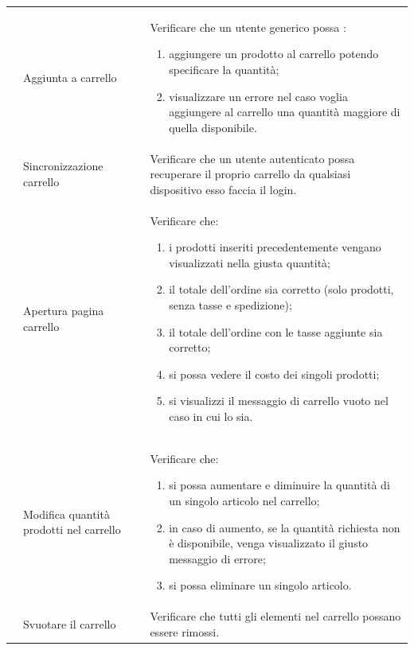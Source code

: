 \begin{center}
\begin{longtable}{|p{1cm}|p{4.85cm}|p{9cm}|}
		 & Aggiunta a carrello & Verificare che un utente generico possa : 
		\begin{enumerate}
			\item   aggiungere un prodotto al carrello potendo specificare la quantità;
			\item   visualizzare un errore nel caso voglia aggiungere al carrello una quantità maggiore di quella disponibile.
		\end{enumerate} \\

		 & Sincronizzazione carrello & Verificare che un utente autenticato possa recuperare il proprio carrello da qualsiasi dispositivo esso faccia il login.\\

		 & Apertura pagina carrello & Verificare che: 
		\begin{enumerate}
			\item i prodotti inseriti precedentemente vengano visualizzati nella giusta quantità;
			\item il totale dell'ordine sia corretto (solo prodotti, senza tasse e spedizione);
			\item il totale dell'ordine con le tasse aggiunte sia corretto;
			\item si possa vedere il costo dei singoli prodotti;
			\item si visualizzi il messaggio di carrello vuoto nel caso in cui lo sia.
		\end{enumerate} \\

		 & Modifica quantità prodotti nel carrello & Verificare che:
		\begin{enumerate}
			\item si possa aumentare e diminuire la quantità di un singolo articolo nel carrello;
			\item in caso di aumento, se la quantità richiesta non è disponibile, venga visualizzato il giusto messaggio di errore;
			\item si possa eliminare un singolo articolo.
		\end{enumerate}\\

		 & Svuotare il carrello & Verificare che tutti gli elementi nel carrello possano essere rimossi. \\


\end{longtable}
\end{center}

